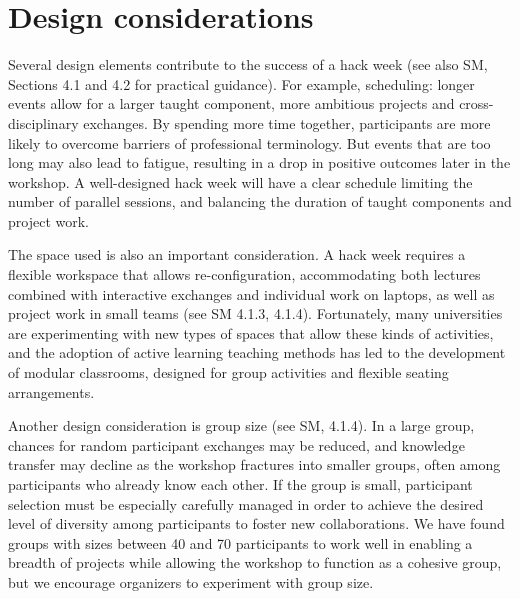 \section*{Design considerations}

Several design elements contribute to the success of a hack week (see also SM, Sections 4.1 and 4.2 for practical guidance).
For example, scheduling: longer events allow for a larger taught component, more ambitious projects and cross-disciplinary exchanges.
By spending more time together, participants are more likely to overcome barriers of professional terminology.
But events that are too long may also lead to fatigue, resulting in a drop in positive outcomes later in the workshop.
A well-designed hack week will have a clear schedule limiting the number of parallel sessions, and balancing the duration of taught components and project work.

The space used is also an important consideration. A hack week requires a flexible workspace that allows re-configuration, accommodating both lectures combined with interactive exchanges and individual work on laptops, as well as project work in small teams (see SM 4.1.3, 4.1.4).
Fortunately, many universities are experimenting with new types of spaces that allow these kinds of activities, and the adoption of active learning teaching methods \cite{prince2004} has led to the development of modular classrooms, designed for group activities and flexible seating arrangements.

Another design consideration is group size (see SM, 4.1.4).
In a large group, chances for random participant exchanges may be reduced, and knowledge transfer may decline as the workshop fractures into smaller groups, often among participants who already know each other.
If the group is small, participant selection must be especially carefully managed in order to achieve the desired level of diversity among participants to foster new collaborations.
We have found groups with sizes between 40 and 70 participants to work well in enabling a breadth of projects while allowing the workshop to function as a cohesive group, but we encourage organizers to experiment with group size.



